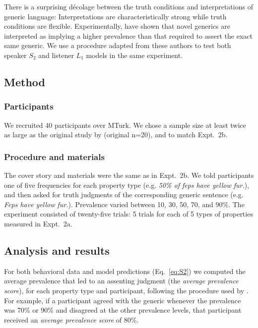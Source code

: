 \documentclass[12pt,letterpaper]{article}
\begin{document}
There is a surprising d\'{e}colage between the truth conditions and interpretations of generic language: Interpretations are characteristically strong while truth conditions are flexible. 
Experimentally,  have shown that novel generics are interpreted as implying a higher prevalence than that required to assert the exact same generic.
We use a procedure adapted from these authors to test both speaker $S_2$ and listener $L_1$ models in the same experiment.


\subsection*{Method}
\subsubsection*{Participants}

We recruited 40 participants over MTurk.  
We chose a sample size at least twice as large as the original study by  (original n=20), and to match Expt.~2b. 

\subsubsection*{Procedure and materials}


The cover story and materials were the same as in Expt.~2b.
We told participants one of five frequencies for each property type (e.g. \emph{50\% of feps have yellow fur.}), and then asked for truth judgments of the corresponding generic sentence (e.g. \emph{Feps have yellow fur.}). Prevalence varied between 10, 30, 50, 70, and 90\%.
The experiment consisted of twenty-five trials: 5 trials for each of 5 types of properties measured in Expt.~2a. 

\subsection*{Analysis and results}

For both behavioral data and model predictions (Eq.~\ref{eq:S2}) we computed the average prevalence that led to an assenting judgment (the \emph{average prevalence score}), for each property type and participant, following the procedure used by .
For example, if a participant agreed with the generic whenever the prevalence was 70\% or 90\% and disagreed at the other prevalence levels, that participant received an \emph{average prevalence score} of 80\%.
\end{document}
